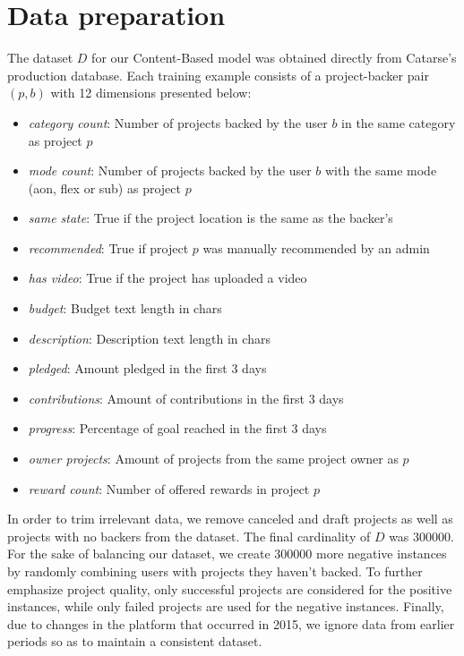 \documentclass[cic,tc,english]{iiufrgs}
\begin{document}
\section{Data preparation}
The dataset \(D\) for our Content-Based model was obtained directly from Catarse's production database. Each training example consists of a project-backer pair \((p,b)\) with 12 dimensions presented below:
\begin{itemize}

    \item \emph{category count}: Number of projects backed by the user \(b\) in the same category as project \(p\)
    \item \emph{mode count}: Number of projects backed by the user \(b\) with the same mode (aon, flex or sub) as project \(p\)
    \item \emph{same state}: True if the project location is the same as the backer's
    \item \emph{recommended}: True if project \(p\) was manually recommended by an admin
    \item \emph{has video}: True if the project has uploaded a video
    \item \emph{budget}: Budget text length in chars
    \item \emph{description}: Description text length in chars
    \item \emph{pledged}: Amount pledged in the first 3 days
    \item \emph{contributions}: Amount of contributions in the first 3 days
    \item \emph{progress}: Percentage of goal reached in the first 3 days
    \item \emph{owner projects}: Amount of projects from the same project owner as \(p\)
    \item \emph{reward count}: Number of offered rewards in project \(p\)
\end{itemize}

In order to trim irrelevant data, we remove canceled and draft projects as well as projects with no backers from the dataset. The final cardinality of \(D\) was 300000. For the sake of balancing our dataset, we create 300000 more negative instances by randomly combining users with projects they haven't backed. To further emphasize project quality, only successful projects are considered for the positive instances, while only failed projects are used for the negative instances. Finally, due to changes in the platform that occurred in 2015, we ignore data from earlier periods so as to maintain a consistent dataset.
\end{document}
